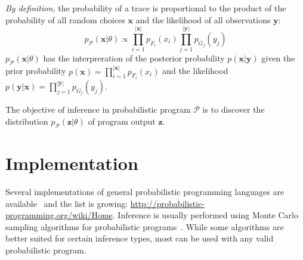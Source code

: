 \documentclass[a4paper,oneside]{article}
\begin{document}
\emph{By definition,} the probability of a trace is proportional
to the product of the probability of all random choices
$\pmb{x}$ and the likelihood of all observations $\pmb{y}$:
\begin{equation}
	p_{\mathcal{P}}(\pmb{x}|\theta) \propto \prod_{i=1}^{\left|\pmb{x}\right|}
	p_{F_i}(x_i) \prod_{j=1}^{\left|\pmb{y}\right|}p_{G_j}(y_{j})
  \label{eqn:p-trace}
\end{equation}
$p_{\mathcal{P}}(\pmb{x}|\theta)$ has the interpreration of the
posterior probability $p(\pmb{x}|\pmb{y})$ given the prior
probability $p(\pmb{x}) = \prod_{i=1}^{\left|\pmb{x}\right|}
p_{F_i}(x_i)$ and the likelihood $p(\pmb{y}|\pmb{x}) =
\prod_{j=1}^{\left|\pmb{y}\right|} p_{G_j}(y_{j})$.

The objective of inference in probabilistic program
$\mathcal{P}$ is to discover the distribution
$p_{\mathcal{P}}(\pmb{z}|\theta)$ of program output $\pmb{z}$.

\section*{Implementation}

Several implementations of general probabilistic programming
languages are available~\cite{GMR+08,MSP14,WVM14} and the list
is growing: \url{http://probabilistic-programming.org/wiki/Home}.
Inference is usually performed using Monte Carlo sampling
algorithms for probabilistic programs~\cite{WSG11,WVM14,PWD+14}.
While some algorithms are better suited for certain inference
types, most can be used with any valid probabilistic program.

 
\end{document}
